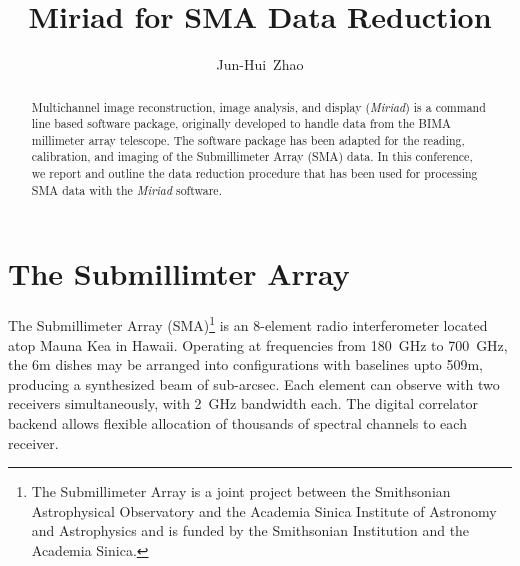 
\resetcounters




\title{Miriad for SMA Data Reduction}
\author{Jun-Hui~Zhao
}


\begin{abstract}
Multichannel image reconstruction, image analysis, and display ({\it {}Miriad}) is a command line based software package, originally developed to handle data from the BIMA millimeter array telescope. The software package has been adapted for the reading, calibration, and imaging of the Submillimeter Array (SMA)  data. In this conference, we report and outline the data reduction procedure that has been used for processing SMA data with the {\it {}Miriad} software. 	 
\end{abstract}

\section{The Submillimter Array}
The Submillimeter Array (SMA)\footnote{The Submillimeter Array is a joint project between the Smithsonian Astrophysical Observatory and the Academia Sinica Institute of Astronomy and Astrophysics and is funded by the Smithsonian Institution and the Academia Sinica.} is an 8-element radio interferometer located atop Mauna Kea in Hawaii. Operating at frequencies from 180~GHz to 700~GHz, the 6m dishes may be arranged into configurations with baselines upto 509m, producing a synthesized beam of sub-arcsec. Each element can observe with two receivers simultaneously, with 2~GHz bandwidth each. The digital correlator backend allows flexible allocation of thousands of spectral channels to each receiver.

